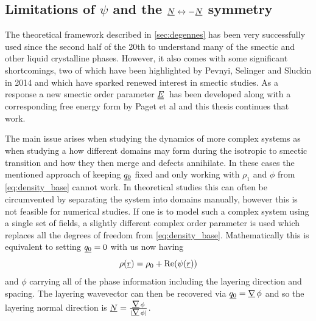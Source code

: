 \documentclass[12pt]{article}
\newcommand{\suf}[2]{\stackunder[0.5pt]{\stackunder[1pt]{\ensuremath{#1}}{\rule{\widthof{\ensuremath{#2}}*\real{0.9}}{.1ex}}}{}}
\newcommand{\duf}[2]{\stackunder[0.5pt]{\stackunder[0.8pt]{\stackunder[1pt]{\ensuremath{#1}}{\rule{\widthof{\ensuremath{#2}}*\real{0.9}}{.1ex}}}{\rule{\widthof{\ensuremath{#2}}*\real{0.9}}{.1ex}}}{}}
\newcommand{\su}[1]{\suf{#1}{#1}}
\newcommand{\du}[1]{\duf{#1}{#1}}
\newcommand{\mgrad}{\ensuremath{\suf{\nabla}{K}\,}}
\newcommand{\EE}{\ensuremath{\du{E}}}
\begin{document}
    \subsection{Limitations of $\psi$ and the $\su{N} \leftrightarrow -\su{N}$ symmetry}\label{sec:pevnyi}
        The theoretical framework described in \cref{sec:degennes} has been very successfully used since the second half of the 20th to understand many of the smectic and other liquid crystalline phases.
        However, it also comes with some significant shortcomings, two of which have been highlighted by Pevnyi, Selinger and Sluckin in 2014\cite{pevnyiModelingSmecticLayers2014} and which have sparked renewed interest in smectic studies.
        As a response a new smectic order parameter \EE\ has been developed along with a corresponding free energy form by Paget et al\cite{pagetComplexTensorsSimple2023,pagetSmecticLayeringLandau2022,pagetComplextensorTheorySimple2023} and this thesis continues that work.

        The main issue arises when studying the dynamics of more complex systems as when studying a how different domains may form during the isotropic to smectic transition and how they then merge and defects annihilate\cite{ambrozicAnnihilationEdgeDislocations2004,abukhdeirDefectKineticsDynamics2008}.
        In these cases the mentioned approach of keeping $\su{q_0}$ fixed and only working with $\rho_1$ and $\phi$ from \cref{eq:density_base} cannot work.
        In theoretical studies this can often be circumvented by separating the system into domains manually, however this is not feasible for numerical studies.
        If one is to model such a complex system using a single set of fields, a slightly different complex order parameter is used which replaces all the degrees of freedom from \cref{eq:density_base}\cite{mukherjeeSimpleLandauModel2001,mukherjeeAdvancesIsotropicSmectic2021}.
        Mathematically this is equivalent to setting $\su{q_0} = 0$ with us now having
        \begin{equation}\label{eq:density_pevnyi}
            \rho(\su{r}) = \rho_0 + \Re(\psi(\su{r}))
        \end{equation}
        and $\phi$ carrying all of the phase information including the layering direction and spacing.
        The layering wavevector can then be recovered via $\su{q_0} = \mgrad \phi$ and so the layering normal direction is $\su{N} = \frac{\mgrad \phi}{|\mgrad \phi|}$.
\end{document}
